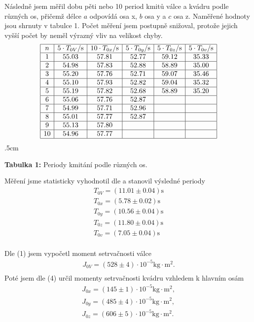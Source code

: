 \documentclass[a4paper,12pt]{article}
\begin{document}
Následně jsem měřil dobu pěti nebo 10 period kmitů válce a kvádru podle různých os, 
přičemž délce $a$ odpovídá osa x, $b$ osa y a $c$ osa z. Naměřené hodnoty jsou shrnuty v tabulce 1. 
Počet měření jsem postupně snižoval, protože jejich vyšší počet by neměl výrazný 
vliv na velikost chyby.
$$
\begin{array}{|c|c|c|c|c|c|}
\hline
n&	5\cdot T_{0V}/\mbox{s}&		10\cdot T_{0x}/\mbox{s}&		5\cdot T_{0y}/\mbox{s}&		5\cdot T_{0z}/\mbox{s}&		5\cdot T_{0v}/\mbox{s}	\\ \hline
1&	55.03&				57.81&				52.77&				59.12&				35.33			\\ \hline
2&	54.98&				57.83&				52.88&				58.89&				35.00			\\ \hline
3&	55.20&				57.76&				52.71&				59.07&				35.46			\\ \hline
4&	55.10&				57.93&				52.82&				59.04&				35.32			\\ \hline
5&	55.19&				57.82&				52.68&				58.89&				35.20			\\ \hline
6&	55.06&				57.76&				52.87& & \\ \hline
7&	54.99&				57.71&				52.96& & \\ \hline
8&	55.01&				57.77&				52.87& & \\ \hline
9&	55.13&				57.80& & & \\ \hline
10&	54.96&				57.77& & & \\ \hline
\end{array}
$$
\vglue.5cm
\begin{center}
\textbf{Tabulka 1:} Periody kmitání podle různých os.
\end{center}

Měření jsme statisticky vyhodnotil dle \cite{chyba} a stanovil výsledné periody
\begin{eqnarray}
	T_{0V}=(11.01 \pm 0.04)\mbox{s} \\
	T_{0x}=(5.78 \pm 0.02)\mbox{s} \\
	T_{0y}=(10.56 \pm 0.04)\mbox{s} \\
	T_{0z}=(11.80 \pm 0.04)\mbox{s} \\
	T_{0v}=(7.05 \pm 0.04)\mbox{s} \\
\end{eqnarray}

Dle (1) jsem vypočetl moment setrvačnosti válce
\begin{eqnarray}
	J_{0V}=(528\pm4)\cdot 10^{-5} \mbox{kg}\cdot\mbox{m}^2.\\
\end{eqnarray}
Poté jsem dle (4) určil momenty setrvačnosti kvádru vzhledem k hlavním osám
\begin{eqnarray}
	J_{0x}=(145\pm1)\cdot 10^{-5} \mbox{kg}\cdot\mbox{m}^2,\\
	J_{0y}=(485\pm4)\cdot 10^{-5} \mbox{kg}\cdot\mbox{m}^2,\\
	J_{0z}=(606\pm5)\cdot 10^{-5} \mbox{kg}\cdot\mbox{m}^2.
\end{eqnarray}
\end{document}
